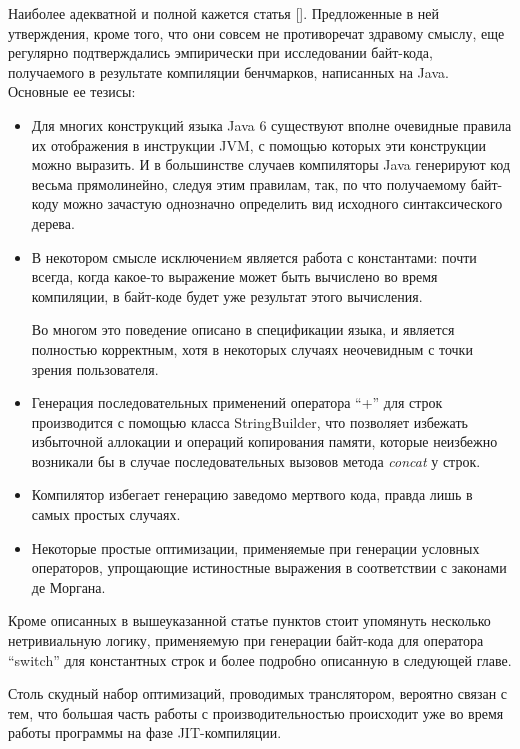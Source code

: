 Наиболее адекватной и полной кажется статья [].
Предложенные в ней утверждения, кроме того, что они совсем не противоречат здравому смыслу,
еще регулярно подтверждались эмпирически при исследовании байт-кода, получаемого в результате
компиляции бенчмарков, написанных на Java. %
Основные ее тезисы:
\begin{itemize}
    \item Для многих конструкций языка Java 6 существуют вполне очевидные правила их отображения
    в инструкции JVM, с помощью которых эти конструкции можно выразить.
    И в большинстве случаев компиляторы Java генерируют код весьма прямолинейно, следуя этим
    правилам, так, по что получаемому байт-коду можно зачастую однозначно определить вид исходного
    синтаксического дерева.
    \item В некотором смысле исключениeм является работа с константами:
    почти всегда, когда какое-то выражение может быть вычислено во время компиляции, в байт-коде
    будет уже результат этого вычисления.

    Во многом это поведение описано в спецификации языка, и является полностью корректным,
    хотя в некоторых случаях неочевидным с точки зрения пользователя.

    \item Генерация последовательных применений оператора ``+'' для строк производится с помощью
    класса StringBuilder, что позволяет избежать избыточной аллокации и операций копирования памяти,
    которые неизбежно возникали бы в случае последовательных вызовов метода \textit{concat} у строк.

    \item Компилятор избегает генерацию заведомо мертвого кода, правда лишь в самых простых случаях.

    \item Некоторые простые оптимизации, применяемые при генерации условных операторов, упрощающие
    истиностные выражения в соответствии с законами де Моргана.
\end{itemize}

Кроме описанных в вышеуказанной статье пунктов стоит упомянуть несколько нетривиальную логику,
применяемую при генерации байт-кода для оператора ``switch'' для константных строк и более подробно
описанную в следующей главе. %

Столь скудный набор оптимизаций, проводимых транслятором, вероятно связан с тем, что большая часть
работы с производительностью происходит уже во время работы программы на фазе JIT-компиляции.

